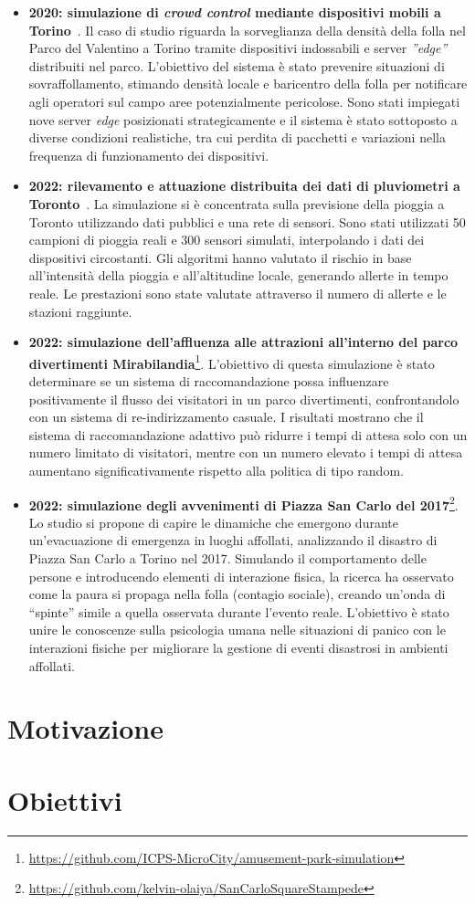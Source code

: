 \begin{itemize}
	\item \textbf{2020: simulazione di \textit{crowd control} mediante dispositivi mobili a Torino}~\cite{Audrito2021}.
	Il caso di studio riguarda la sorveglianza della densità della folla nel Parco del Valentino a Torino tramite dispositivi indossabili e server \textit{''edge''} distribuiti nel parco. L'obiettivo del sistema è stato prevenire situazioni di sovraffollamento, stimando densità locale e baricentro della folla per notificare agli operatori sul campo aree potenzialmente pericolose. Sono stati impiegati nove server \textit{edge} posizionati strategicamente e il sistema è stato sottoposto a diverse condizioni realistiche, tra cui perdita di pacchetti e variazioni nella frequenza di funzionamento dei dispositivi.
	\item \textbf{2022: rilevamento e attuazione distribuita dei dati di pluviometri a Toronto}~\cite{Aguzzi_2022}.
	La simulazione si è concentrata sulla previsione della pioggia a Toronto utilizzando dati pubblici e una rete di sensori. Sono stati utilizzati 50 campioni di pioggia reali e 300 sensori simulati, interpolando i dati dei dispositivi circostanti. Gli algoritmi hanno valutato il rischio in base all'intensità della pioggia e all'altitudine locale, generando allerte in tempo reale. Le prestazioni sono state valutate attraverso il numero di allerte e le stazioni raggiunte.
 	\item \textbf{2022:  simulazione dell'affluenza alle attrazioni all'interno del parco divertimenti Mirabilandia}\footnote{\url{https://github.com/ICPS-MicroCity/amusement-park-simulation}}.
	L'obiettivo di questa simulazione è stato determinare se un sistema di raccomandazione possa influenzare positivamente il flusso dei visitatori in un parco divertimenti, confrontandolo con un sistema di re-indirizzamento casuale. I risultati mostrano che il sistema di raccomandazione adattivo può ridurre i tempi di attesa solo con un numero limitato di visitatori, mentre con un numero elevato i tempi di attesa aumentano significativamente rispetto alla politica di tipo random.
	\item \textbf{2022: simulazione degli avvenimenti di Piazza San Carlo del 2017}\footnote{\url{https://github.com/kelvin-olaiya/SanCarloSquareStampede}}.
	Lo studio si propone di capire le dinamiche che emergono durante un'evacuazione di emergenza in luoghi affollati, analizzando il disastro di Piazza San Carlo a Torino nel 2017. Simulando il comportamento delle persone e introducendo elementi di interazione fisica, la ricerca ha osservato come la paura si propaga nella folla (contagio sociale), creando un'onda di ``spinte'' simile a quella osservata durante l'evento reale. L'obiettivo è stato unire le conoscenze sulla psicologia umana nelle situazioni di panico con le interazioni fisiche per migliorare la gestione di eventi disastrosi in ambienti affollati.
\end{itemize}

\section{Motivazione}
\section{Obiettivi}